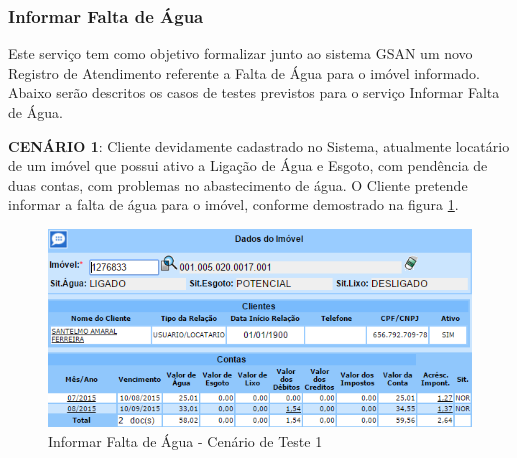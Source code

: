 \subsubsection{Informar Falta de Água}
Este serviço tem como objetivo formalizar junto ao sistema GSAN um novo Registro de Atendimento referente a Falta de Água para o imóvel informado.
Abaixo serão descritos os casos de testes previstos para o serviço Informar Falta de Água.
\begin{flushleft}
	\begin{description}
		\item \textbf{CENÁRIO 1}: Cliente devidamente cadastrado no Sistema, atualmente locatário de um imóvel que possui ativo a Ligação de Água e Esgoto, com pendência de duas contas, com problemas no abastecimento de água. O Cliente pretende informar a falta de água para o imóvel, conforme demostrado na figura \ref{figura:informarFaltaAguaCenario1}.
		\begin{figure}[H]
			\centering
			\caption{Informar Falta de Água - Cenário de Teste 1}
			\label{figura:informarFaltaAguaCenario1}
			\includegraphics{figuras/cenarios/informar_falta_agua/cenario_1.PNG}
		\end{figure}
	\end{description}
	

\end{flushleft}
